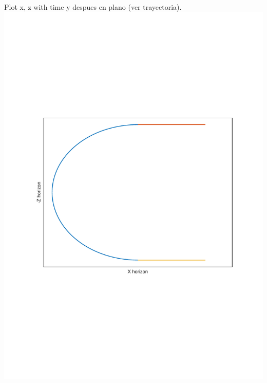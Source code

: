 Plot x, z with time y despues en plano (ver trayectoria).
\includegraphics[width=\linewidth]{../matlab/trajectory.pdf}